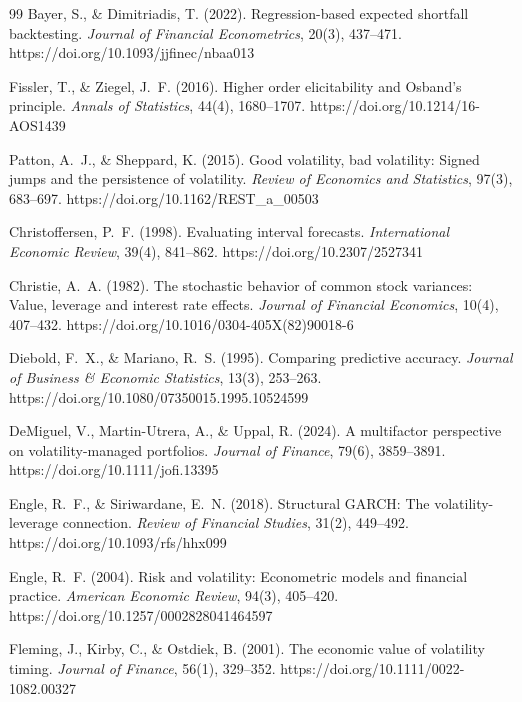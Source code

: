 \documentclass[12pt,a4paper]{article}
\begin{document}
\begin{thebibliography}{99}
Bayer, S., \& Dimitriadis, T. (2022). Regression-based expected shortfall backtesting. \textit{Journal of Financial Econometrics}, 20(3), 437--471. https://doi.org/10.1093/jjfinec/nbaa013

Fissler, T., \& Ziegel, J.~F. (2016). Higher order elicitability and Osband's principle. \textit{Annals of Statistics}, 44(4), 1680--1707. https://doi.org/10.1214/16-AOS1439

Patton, A.~J., \& Sheppard, K. (2015). Good volatility, bad volatility: Signed jumps and the persistence of volatility. \textit{Review of Economics and Statistics}, 97(3), 683--697. https://doi.org/10.1162/REST\_a\_00503

Christoffersen, P.~F. (1998). Evaluating interval forecasts. \textit{International Economic Review}, 39(4), 841--862. https://doi.org/10.2307/2527341

Christie, A.~A. (1982). The stochastic behavior of common stock variances: Value, leverage and interest rate effects. \textit{Journal of Financial Economics}, 10(4), 407--432. https://doi.org/10.1016/0304-405X(82)90018-6

Diebold, F.~X., \& Mariano, R.~S. (1995). Comparing predictive accuracy. \textit{Journal of Business \& Economic Statistics}, 13(3), 253--263. https://doi.org/10.1080/07350015.1995.10524599

DeMiguel, V., Martin-Utrera, A., \& Uppal, R. (2024). A multifactor perspective on volatility-managed portfolios. \textit{Journal of Finance}, 79(6), 3859--3891. https://doi.org/10.1111/jofi.13395

Engle, R.~F., \& Siriwardane, E.~N. (2018). Structural GARCH: The volatility-leverage connection. \textit{Review of Financial Studies}, 31(2), 449--492. https://doi.org/10.1093/rfs/hhx099

Engle, R.~F. (2004). Risk and volatility: Econometric models and financial practice. \textit{American Economic Review}, 94(3), 405--420. https://doi.org/10.1257/0002828041464597

Fleming, J., Kirby, C., \& Ostdiek, B. (2001). The economic value of volatility timing. \textit{Journal of Finance}, 56(1), 329--352. https://doi.org/10.1111/0022-1082.00327


\end{thebibliography}
\end{document}
